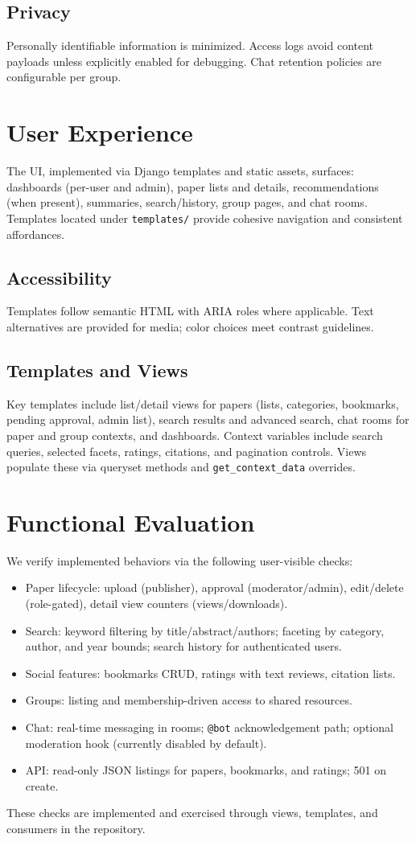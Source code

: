 \documentclass[conference]{IEEEtran}
\begin{document}
\subsection{Privacy}
Personally identifiable information is minimized. Access logs avoid content payloads unless explicitly enabled for debugging. Chat retention policies are configurable per group.

\section{User Experience}
The UI, implemented via Django templates and static assets, surfaces: dashboards (per-user and admin), paper lists and details, recommendations (when present), summaries, search/history, group pages, and chat rooms. Templates located under \texttt{templates/} provide cohesive navigation and consistent affordances.

\subsection{Accessibility}
Templates follow semantic HTML with ARIA roles where applicable. Text alternatives are provided for media; color choices meet contrast guidelines.

\subsection{Templates and Views}
Key templates include list/detail views for papers (lists, categories, bookmarks, pending approval, admin list), search results and advanced search, chat rooms for paper and group contexts, and dashboards. Context variables include search queries, selected facets, ratings, citations, and pagination controls. Views populate these via queryset methods and \texttt{get\_context\_data} overrides.

\section{Functional Evaluation}
We verify implemented behaviors via the following user-visible checks:
\begin{itemize}
  \item Paper lifecycle: upload (publisher), approval (moderator/admin), edit/delete (role-gated), detail view counters (views/downloads).
  \item Search: keyword filtering by title/abstract/authors; faceting by category, author, and year bounds; search history for authenticated users.
  \item Social features: bookmarks CRUD, ratings with text reviews, citation lists.
  \item Groups: listing and membership-driven access to shared resources.
  \item Chat: real-time messaging in rooms; \texttt{@bot} acknowledgement path; optional moderation hook (currently disabled by default).
  \item API: read-only JSON listings for papers, bookmarks, and ratings; 501 on create.
\end{itemize}
These checks are implemented and exercised through views, templates, and consumers in the repository.
\end{document}
